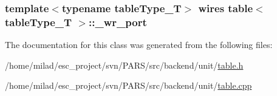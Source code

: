 \label{classtable_ae804042049b8e94591efe22ae05c0371}
\hypertarget{classtable_a7c068dc525606b03270d704ea3494f91}{
\subsubsection[{\_\-wr\_\-port}]{\setlength{\rightskip}{0pt plus 5cm}template$<$typename tableType\_\-T$>$ {\bf wires} {\bf table}$<$ tableType\_\-T $>$::{\bf \_\-wr\_\-port}}}
\label{classtable_a7c068dc525606b03270d704ea3494f91}


The documentation for this class was generated from the following files:\begin{DoxyCompactItemize}
\item 
/home/milad/esc\_\-project/svn/PARS/src/backend/unit/\hyperlink{table_8h}{table.h}\item 
/home/milad/esc\_\-project/svn/PARS/src/backend/unit/\hyperlink{table_8cpp}{table.cpp}\end{DoxyCompactItemize}
